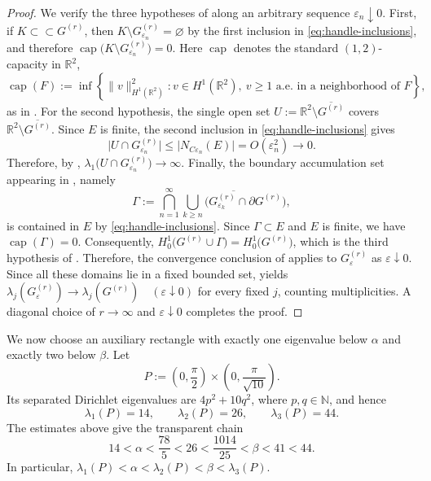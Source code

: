 \documentclass[11pt,letterpaper,reqno]{amsart}
\theoremstyle{definition}
\begin{document}
\begin{proof}
We verify the three hypotheses of \cite[Theorem~7.5]{Daners2003} along
an arbitrary sequence \(\varepsilon_n\downarrow0\).  First, if \(K\subset\subset G^{(r)}\), then
\(K\setminus G^{(r)}_{\varepsilon_n}=\varnothing\) by the first
inclusion in \eqref{eq:handle-inclusions}, and therefore $
 \operatorname{cap}
 \bigl(K\setminus G^{(r)}_{\varepsilon_n}\bigr)=0$.
Here \(\operatorname{cap}\) denotes the standard \((1,2)\)-capacity in
\(\mathbb R^2\),
\[
 \operatorname{cap}(F)
 :=
 \inf\left\{
   \|v\|_{H^1(\mathbb R^2)}^2:
   v\in H^1(\mathbb R^2),\
   v\geq1 \text{ a.e.\ in a neighborhood of }F
 \right\},
\]
as in \cite[p.~605]{Daners2003}. For the second
hypothesis, the single open set $U:=\mathbb R^2\setminus\overline{G^{(r)}}$ covers \(\mathbb R^2\setminus\overline{G^{(r)}}\).
Since \(E\) is finite, the second inclusion in
\eqref{eq:handle-inclusions} gives
\[
 \bigl|U\cap G^{(r)}_{\varepsilon_n}\bigr|
 \leq \bigl|N_{C\varepsilon_n}(E)\bigr|
 =O(\varepsilon_n^2)\longrightarrow0.
\]
Therefore, by \cite[Proposition~7.6(1)]{Daners2003}, $
 \lambda_1\bigl(U\cap G^{(r)}_{\varepsilon_n}\bigr)
 \longrightarrow\infty$.
Finally, the boundary accumulation set appearing in
\cite[(7.2)]{Daners2003}, namely
\[
 \Gamma:=\bigcap_{n=1}^{\infty}
 \overline{\bigcup_{k\geq n}
 \bigl(G^{(r)}_{\varepsilon_k}\cap\partial G^{(r)}\bigr)},
\]
is contained in \(E\) by \eqref{eq:handle-inclusions}. Since \(\Gamma\subset E\) and \(E\) is finite, we have
\(\operatorname{cap}(\Gamma)=0\).  Consequently, $
 H_0^1\bigl(G^{(r)}\cup\Gamma\bigr)
 =
 H_0^1\bigl(G^{(r)}\bigr)$,
which is the third hypothesis of
\cite[Theorem~7.5]{Daners2003}. Therefore, the convergence conclusion of \cite[Theorem~7.5]{Daners2003} applies to
\(G^{(r)}_{\varepsilon}\) as \(\varepsilon\downarrow 0\). Since all these domains lie in a fixed bounded
set, \cite[Corollary~4.7 and Remark~4.3]{Daners2003} yields $
 \lambda_j(G^{(r)}_\varepsilon)
 \longrightarrow\lambda_j(G^{(r)})
 \quad (\varepsilon\downarrow0)$
for every fixed \(j\), counting multiplicities.
A diagonal choice of \(r\to\infty\) and \(\varepsilon\downarrow0\)
completes the proof.
\end{proof}


We now choose an auxiliary rectangle with exactly one eigenvalue below
$\alpha$ and exactly two below $\beta$.  Let
\[
 P:=\left(0,\frac{\pi}{2}\right)
 \times\left(0,\frac{\pi}{\sqrt{10}}\right).
\]
Its separated Dirichlet eigenvalues are $4p^2+10q^2$, where $p,q\in\mathbb{N}$, and hence
\[
 \lambda_1(P)=14,
 \qquad
 \lambda_2(P)=26,
 \qquad
 \lambda_3(P)=44.
\]
The estimates above give the transparent chain
\begin{equation}\label{eq:interlacing}
 14<\alpha<\frac{78}{5}<26
 <\frac{1014}{25}<\beta<41<44.
\end{equation}
In particular,
$\lambda_1(P)<\alpha<\lambda_2(P)<\beta<\lambda_3(P)$.
\end{document}
